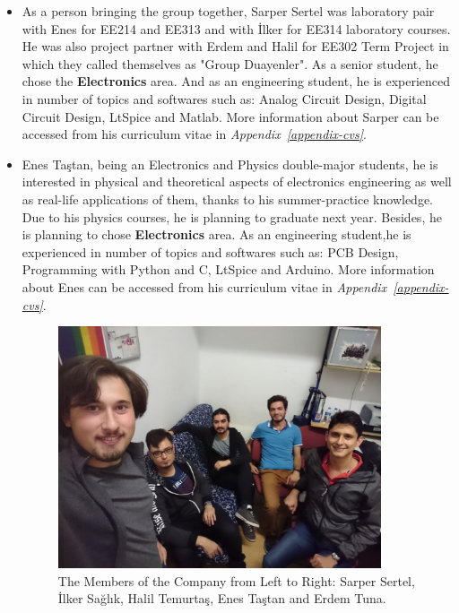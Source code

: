 \documentclass[a4paper,12pt]{article}
\begin{document}
%




\begin{itemize}
	\item As a person bringing the group together, Sarper Sertel was laboratory pair with Enes for EE214 and EE313 and with İlker for EE314 laboratory courses. He was also project partner with Erdem and Halil for EE302 Term Project in which they called themselves as "Group Duayenler". As a senior student, he chose the \textbf{Electronics} area. And as an engineering student, he is experienced in number of topics and softwares such as: Analog Circuit Design, Digital Circuit Design, LtSpice and Matlab. More information about Sarper can be accessed from his curriculum vitae in  \textit{Appendix~\ref{appendix-cvs}}.
	\item Enes Taştan, being an Electronics and Physics double-major students, he is  interested in physical and theoretical aspects of electronics engineering as well as real-life applications of them, thanks to his summer-practice knowledge. Due to his physics courses, he is planning to graduate next year. Besides, he is planning to chose \textbf{Electronics} area. As an engineering student,he is experienced in number of topics and softwares such as: PCB Design, Programming with Python and C, LtSpice and Arduino. More information about Enes can be accessed from his curriculum vitae in  \textit{Appendix~\ref{appendix-cvs}}.
	
\begin{figure}[H]
	\centering
	\includegraphics[width=0.9\textwidth,height=\textheight,keepaspectratio]{images/meeting2} 
	\caption{\label{fig:united-photo}The Members of the Company from Left to Right: Sarper Sertel, İlker Sağlık, Halil Temurtaş, Enes Taştan and Erdem Tuna.}
	

\end{figure}
\end{itemize}
\end{document}
